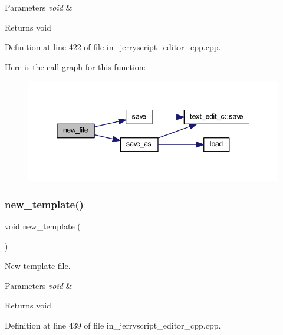 \begin{DoxyParams}{Parameters}
{\em void} & \\
\hline
\end{DoxyParams}
\begin{DoxyReturn}{Returns}
void 
\end{DoxyReturn}


Definition at line 422 of file in\+\_\+jerryscript\+\_\+editor\+\_\+cpp.\+cpp.

Here is the call graph for this function\+:
\nopagebreak
\begin{figure}[H]
\begin{center}
\leavevmode
\includegraphics[width=345pt]{group___editor_ga24e4d4948e63a16f025b4d2c19546ca0_cgraph}
\end{center}
\end{figure}
\mbox{\label{group___editor_ga9b68cbeec78749fe78f75c3a94ab47f4}} 
\subsubsection{new\_template()}
{\footnotesize\ttfamily void new\+\_\+template (\begin{DoxyParamCaption}\item[{void}]{ }\end{DoxyParamCaption})}



New template file. 


\begin{DoxyParams}{Parameters}
{\em void} & \\
\hline
\end{DoxyParams}
\begin{DoxyReturn}{Returns}
void 
\end{DoxyReturn}


Definition at line 439 of file in\+\_\+jerryscript\+\_\+editor\+\_\+cpp.\+cpp.

